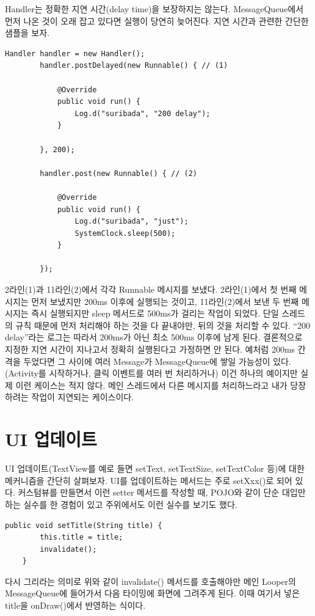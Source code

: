 Handler는 정확한 지연 시간(delay time)을 보장하지는 않는다. MessageQueue에서 먼저 나온 것이 오래 잡고 있다면 실행이 당연히 늦어진다. 지연 시간과 관련한 간단한 샘플을 보자.
\begin{lstlisting}[frame=single, caption=부정확한 지연시간] 
		Handler handler = new Handler();
		handler.postDelayed(new Runnable() { // (1)

			@Override
			public void run() {
				Log.d("suribada", "200 delay");
			}
			
		}, 200);
		
		handler.post(new Runnable() { // (2)

			@Override
			public void run() {
				Log.d("suribada", "just");
				SystemClock.sleep(500);
			}
			
		});
\end{lstlisting}
2라인(1)과 11라인(2)에서 각각 Runnable 메시지를 보냈다. 2라인(1)에서 첫 번째 메시지는 먼저 보냈지만 200ms 이후에 실행되는 것이고, 11라인(2)에서 보낸 두 번째 메시지는 즉시 실행되지만 sleep 메서드로 500ms가 걸리는 작업이 되었다. 단일 스레드의 규칙 때문에 먼저 처리해야 하는 것을 다 끝내야만, 뒤의 것을 처리할 수 있다. ``200 delay''라는 로그는 따라서 200ms가 아닌 최소 500ms 이후에 남게 된다.
결론적으로 지정한 지연 시간이 지나고서 정확히 실행된다고 가정하면 안 된다. 예처럼 200ms 간격을 두었다면 그 사이에 여러 Message가 MessageQueue에 쌓일 가능성이 있다.(Activity를 시작하거나, 클릭 이벤트를 여러 번 처리하거나)
이건 하나의 예이지만 실제 이런 케이스는 적지 않다. 메인 스레드에서 다른 메시지를 처리하느라고 내가 당장 하려는 작업이 지연되는 케이스이다.\\


\section{UI 업데이트}
UI 업데이트(TextView를 예로 들면 setText, setTextSize, setTextColor 등)에 대한 메커니즘을 간단히 살펴보자.
UI를 업데이트하는 메서드는 주로 setXxx()로 되어 있다. 커스텀뷰를 만들면서 이런 setter 메서드를 작성할 때, POJO와 같이 단순 대입만 하는 실수를 한 경험이 있고 주위에서도 이런 실수를 보기도 했다. 
\begin{lstlisting}[frame=single]
	public void setTitle(String title) {
		this.title = title;
		invalidate();
	}
\end{lstlisting}
다시 그리라는 의미로 위와 같이 invalidate() 메서드를 호출해야만 메인 Looper의 MessageQueue에 들어가서 다음 타이밍에 화면에 그려주게 된다. 이때 여기서 넣은 title을 onDraw()에서 반영하는 식이다.\\

